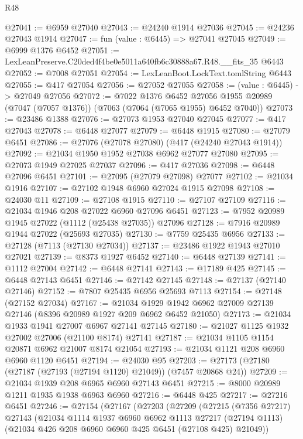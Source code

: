 \begin{lexlean}{R48}
\begin{coremodule}
@27041 := @6959 @27040
@27043 := @24240 @1914 @27036
@27045 := @24236 @27043 @1914
@27047 := fun (value : @6445) => @27041 @27045
@27049 := @6999 @1376 @6452
@27051 := LexLeanPreserve.C20ded4f4be0e5011a640fb6c30888a67.R48.__fits_35 @6443
@27052 := @7008 @27051
@27054 := LexLeanBoot.LockText.tomlString @6443
@27055 := @417 @27054
@27056 := @27052 @27055
@27058 := (value : @6445) -> @27049 @27056
@27072 := @7022
    @1376
    @6452
    @27056
    @1955
    @20989
    (@7047 (@7057 @1376))
    (@7063 (@7064 (@7065 @1955) @6452 @7040))
@27073 := @23486 @1388
@27076 := @27073 @1953 @27040 @27045
@27077 := @417 @27043
@27078 := @6448 @27077
@27079 := @6448 @1915
@27080 := @27079 @6451
@27086 := @27076 (@27078 @27080) (@417 (@24240 @27043 @1914))
@27092 := @21034 @1950 @1952 @27038 @6962 @27077 @27080
@27095 := @27073 @1949 @27025 @27037
@27096 := @417 @27036
@27098 := @6448 @27096 @6451
@27101 := @27095 (@27079 @27098) @27077
@27102 := @21034 @1916
@27107 := @27102 @1948 @6960 @27024 @1915 @27098
@27108 := @24030 @11
@27109 := @27108 @1915
@27110 := @27107 @27109
@27116 := @21034 @1946 @208 @27022 @6960 @27096 @6451
@27123 := @7952 @20989 @1945 @27022 (@1112 (@25438 @27035)) @27096
@27128 := @7916 @20989 @1944 @27022 (@25693 @27035)
@27130 := @7759 @25435 @6956
@27133 := @27128 (@7113 (@27130 @27034))
@27137 := @23486 @1922 @1943 @27010 @27021
@27139 := @8373 @1927 @6452
@27140 := @6448 @27139
@27141 := @1112 @27004
@27142 := @6448 @27141
@27143 := @17189 @425
@27145 := @6448 @27143 @6451
@27146 := @27142 @27145
@27148 := @27137 (@27140 @27146)
@27152 := @7807 @25435 @6956 @25693 @7113
@27154 := @27148 (@27152 @27034)
@27167 := @21034 @1929 @1942 @6962 @27009 @27139 @27146 (@8396 @20989 @1927 @209 @6962 @6452 @21050)
@27173 := @21034 @1933 @1941 @27007 @6967 @27141 @27145
@27180 := @21027 @1125 @1932 @27002 @27006 (@21100 @8174) @27141
@27187 := @21034 @1105 @1154 @20871 @6962 @21007 @8174 @21054
@27193 := @21034 @1121 @208 @6960 @6960 @1120 @6451
@27194 := @24030 @95
@27203 := @27173 (@27180 (@27187 (@27193 (@27194 @1120) @21049)) (@7457 @20868 @24))
@27209 := @21034 @1939 @208 @6965 @6960 @27143 @6451
@27215 := @8000 @20989 @1211 @1935 @1938 @6963 @6960
@27216 := @6448 @425
@27217 := @27216 @6451
@27246 := @27154
    (@27167
      (@27203
        (@27209
          (@27215
            (@7356 @27217)
            @27143
            (@21034
              @1114
              @1937
              @6960
              @6962
              @1113
              @27217
              (@27194 @1113)
              (@21034 @426 @208 @6960 @6960 @425 @6451 (@27108 @425) @21049))

\end{coremodule}
\end{lexlean}
